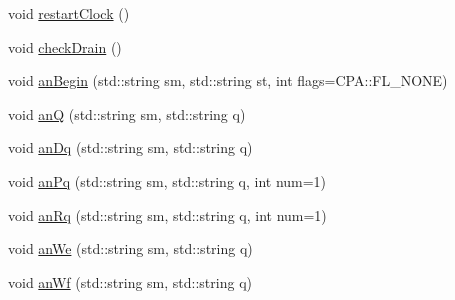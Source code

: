 \begin{DoxyCompactItemize}
\item 
void \hyperlink{classIGbE_a9506deecc41eb6290f9b9b8662cc33c2}{restartClock} ()
\item 
void \hyperlink{classIGbE_a97cbf86aeda5390deb20b1d39396d111}{checkDrain} ()
\item 
void \hyperlink{classIGbE_ac20fadb883428d12627ffa95751acf17}{anBegin} (std::string sm, std::string st, int flags=CPA::FL\_\-NONE)
\item 
void \hyperlink{classIGbE_ad5560d7f7671ea0c96250beacf187ac8}{anQ} (std::string sm, std::string q)
\item 
void \hyperlink{classIGbE_a4d59c58fec3355c64488974a9110bb70}{anDq} (std::string sm, std::string q)
\item 
void \hyperlink{classIGbE_a9398b9f9270a0cfcc96ab2f8ad4b2c87}{anPq} (std::string sm, std::string q, int num=1)
\item 
void \hyperlink{classIGbE_a48fd12dd7cf4b842162b7a0b89875559}{anRq} (std::string sm, std::string q, int num=1)
\item 
void \hyperlink{classIGbE_ace79fee3c0fd652014ae35a7b1497ca1}{anWe} (std::string sm, std::string q)
\item 
void \hyperlink{classIGbE_a09c6a12f9551bd90d913dfe8ed396a67}{anWf} (std::string sm, std::string q)
\end{DoxyCompactItemize}
